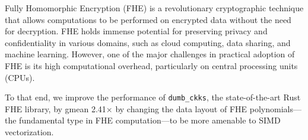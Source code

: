 Fully Homomorphic Encryption (FHE) is a revolutionary cryptographic technique
that allows computations to be performed on encrypted data without the need for
decryption. FHE holds immense potential for preserving privacy and
confidentiality in various domains, such as cloud computing, data sharing, and
machine learning. However, one of the major challenges in practical adoption of
FHE is its high computational overhead, particularly on central processing
units (CPUs).

To that end, we improve the performance of \verb!dumb_ckks!, the
state-of-the-art Rust FHE library, by gmean 2.41$\times$ by changing the data
layout of FHE polynomials---
the fundamental type in FHE computation---to be more amenable to SIMD vectorization.
